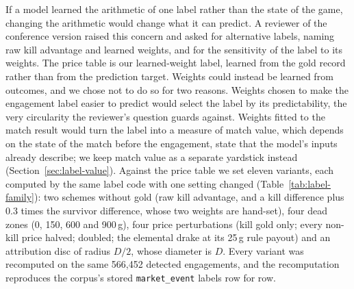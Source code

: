 If a model learned the arithmetic of one label rather than the state of the game, changing the
arithmetic would change what it can predict. A reviewer of the conference version raised this concern
and asked for alternative labels, naming raw kill advantage and learned weights, and for the
sensitivity of the label to its weights. The price table is our learned-weight label, learned from the gold record rather than from
the prediction target. Weights could instead be learned from outcomes, and we chose not to do so for
two reasons. Weights chosen to make the engagement label easier to predict would select the label by
its predictability, the very circularity the reviewer's question guards against. Weights fitted to the
match result would turn the label into a measure of match value, which depends on the state of the
match before the engagement, state that the model's inputs already describe; we keep match value as a
separate yardstick instead (Section~\ref{sec:label-value}). Against the price table we set eleven
variants, each computed by the same label code with one
setting changed (Table~\ref{tab:label-family}): two schemes without gold (raw kill advantage, and a
kill difference plus 0.3 times the survivor difference, whose two weights are hand-set), four dead zones
(0, 150, 600 and 900\,g), four price perturbations (kill gold only; every non-kill price halved;
doubled; the elemental drake at its 25\,g rule payout) and an attribution disc of radius $D/2$, whose
diameter is $D$. Every variant was recomputed on the same 566,452 detected engagements, and the
recomputation reproduces the corpus's stored \texttt{market\_event} labels row for row.

